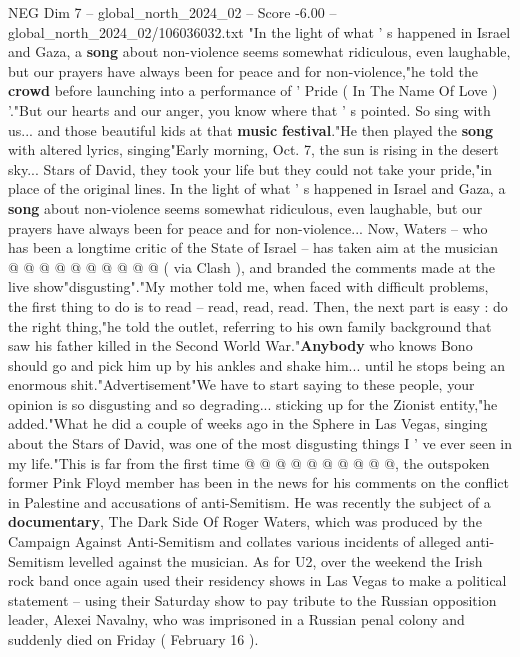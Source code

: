 \begin{textsample}{NEG Dim 7 – global\_north\_2024\_02 – Score -6.00 – global\_north\_2024\_02/106036032.txt}  \label{ex:f7_neg_288}
"In the light of what ' s happened in Israel and Gaza, a \textbf{song} about non-violence seems somewhat ridiculous, even laughable, but our prayers have always been for peace and for non-violence,"he told the \textbf{crowd} before launching into a performance of ' Pride ( In The Name Of Love ) '."But our hearts and our anger, you know where that ' s pointed.
So sing with us... and those beautiful kids at that \textbf{music} \textbf{festival}."He then played the \textbf{song} with altered lyrics, singing"Early morning, Oct. 7, the sun is rising in the desert sky...
Stars of David, they took your life but they could not take your pride,"in place of the original lines.
In the light of what ' s happened in Israel and Gaza, a \textbf{song} about non-violence seems somewhat ridiculous, even laughable, but our prayers have always been for peace and for non-violence...
Now, Waters -- who has been a longtime critic of the State of Israel -- has taken aim at the musician @ @ @ @ @ @ @ @ @ @ ( via Clash ), and branded the comments made at the live show"disgusting"."My mother told me, when faced with difficult problems, the first thing to do is to read -- read, read, read.
Then, the next part is easy : do the right thing,"he told the outlet, referring to his own family background that saw his father killed in the Second World War."\textbf{Anybody} who knows Bono should go and pick him up by his ankles and shake him... until he stops being an enormous shit."Advertisement"We have to start saying to these people, your opinion is so disgusting and so degrading... sticking up for the Zionist entity,"he added."What he did a couple of weeks ago in the Sphere in Las Vegas, singing about the Stars of David, was one of the most disgusting things I ' ve ever seen in my life."This is far from the first time @ @ @ @ @ @ @ @ @ @, the outspoken former Pink Floyd member has been in the news for his comments on the conflict in Palestine and accusations of anti-Semitism.
He was recently the subject of a \textbf{documentary}, The Dark Side Of Roger Waters, which was produced by the Campaign Against Anti-Semitism and collates various incidents of alleged anti-Semitism levelled against the musician.
As for U2, over the weekend the Irish rock band once again used their residency shows in Las Vegas to make a political statement -- using their Saturday show to pay tribute to the Russian opposition leader, Alexei Navalny, who was imprisoned in a Russian penal colony and suddenly died on Friday ( February 16 ).

\end{textsample}
